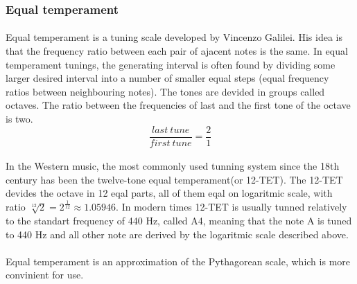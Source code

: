\documentclass[]{article}
\begin{document}
            \subsubsection{Equal temperament}
            \paragraph{}Equal temperament is a tuning scale developed by Vincenzo Galilei. His idea is that the frequency ratio between each pair of ajacent notes is the same. In equal temperament tunings, the generating interval is often found by dividing some larger desired interval into a number of smaller equal steps (equal frequency ratios between neighbouring notes). The tones are devided in groups called octaves. The ratio between the frequencies of last and the first tone of the octave is two.
                $$\frac{last\ tune}{first\ tune} = \frac{2}{1}$$ \paragraph{}
                In the Western music, the most commonly used tunning system since the 18th century has been the twelve-tone equal temperament(or 12-TET). The 12-TET devides the octave in 12 eqal parts, all of them eqal on logaritmic scale, with ratio $\sqrt[12]{2} = 2^\frac{1}{12} \approx 1.05946$. In modern times 12-TET is usually tunned relatively to the standart frequency of 440 Hz, called A4, meaning that the note A is tuned to 440 Hz and all other note are derived by the logaritmic scale described above. \paragraph{}
                Equal temperament is an approximation of the Pythagorean scale, which is more convinient for use.\\
\end{document}
